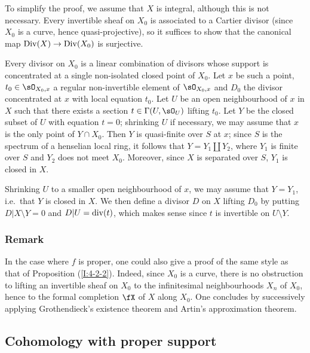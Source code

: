 To simplify the proof, we assume that $X$ is integral,
although this is not necessary. Every invertible sheaf on $X_0$ is
associated to a Cartier divisor (since $X_0$ is a curve, hence
quasi-projective), so it suffices to show that the canonical map
$\operatorname{Div}(X)\to\operatorname{Div}(X_0)$ is surjective.

Every divisor on $X_0$ is a linear combination of divisors whose
support is concentrated at a single non-isolated closed point of $X_0$. Let
$x$ be such a point, $t_0\in\sO_{X_0,x}$ a regular non-invertible element
of $\sO_{X_0,x}$ and $D_0$ the divisor concentrated at $x$ with local equation
$t_0$. Let $U$ be an open neighbourhood of $x$ in $X$ such that there exists a
section $t\in \Gamma(U,\sO_U)$ lifting $t_0$. Let $Y$ be the closed subset of $U$
with equation $t=0$; shrinking $U$ if necessary, we may assume that $x$ is the
only point of $Y\cap X_0$. Then $Y$ is quasi-finite over $S$ at $x$;
since $S$ is the spectrum of a henselian local ring, it follows that
$Y=Y_1\amalg Y_2$, where $Y_1$ is finite over $S$ and $Y_2$ does not meet
$X_0$. Moreover, since $X$ is separated over $S$, $Y_1$ is closed in $X$.

Shrinking $U$ to a smaller open neighbourhood of $x$, we may
assume that $Y=Y_1$, i.e.\ that $Y$ is closed in $X$. We then
define a divisor $D$ on $X$ lifting $D_0$ by putting $D|X\setminus Y=0$ and
$D|U=\operatorname{div}(t)$, which makes sense since $t$ is invertible on $U\setminus Y$. 





\subsubsection{Remark}\label{I:4-4-2}

In the case where $f$ is proper, one could also give a proof
of the same style as that of Proposition (\ref{I:4-2-2}). Indeed, since
$X_0$ is a curve, there is no obstruction to lifting an invertible
sheaf on $X_0$ to the infinitesimal neighbourhoods $X_n$ of $X_0$, hence to the
formal completion $\fX$ of $X$ along $X_0$. One concludes by
successively applying Grothendieck's existence theorem and
Artin's approximation theorem. 










\subsection{Cohomology with proper support}\label{I:4-5}





